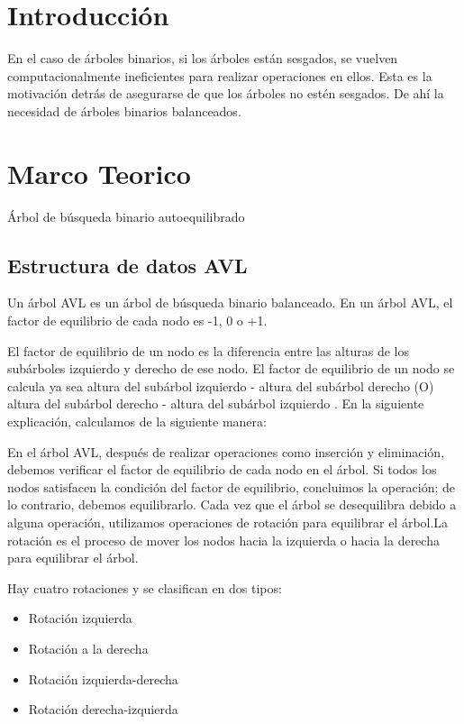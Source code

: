 \documentclass{article}
\begin{document}
    \section{Introducción}
    En el caso de árboles binarios, si los árboles están sesgados, se vuelven computacionalmente ineficientes para realizar operaciones en ellos.
    Esta es la motivación detrás de asegurarse de que los árboles no estén sesgados. De ahí la necesidad de árboles binarios balanceados.

    
    \section{Marco Teorico}
Árbol de búsqueda binario autoequilibrado

	
		\subsection{Estructura de datos AVL}
		
Un árbol AVL es un árbol de búsqueda binario balanceado. En un árbol AVL, el factor de equilibrio de cada nodo es -1, 0 o +1.

El factor de equilibrio de un nodo es la diferencia entre las alturas de los subárboles izquierdo y derecho de ese nodo. El factor de equilibrio de un nodo se calcula ya sea altura del subárbol izquierdo - altura del subárbol derecho (O) altura del subárbol derecho - altura del subárbol izquierdo . En la siguiente explicación, calculamos de la siguiente manera:


En el árbol AVL, después de realizar operaciones como inserción y eliminación, debemos verificar el factor de equilibrio de cada nodo en el árbol. Si todos los nodos satisfacen la condición del factor de equilibrio, concluimos la operación; de lo contrario, debemos equilibrarlo. Cada vez que el árbol se desequilibra debido a alguna operación, utilizamos operaciones de rotación para equilibrar el árbol.La rotación es el proceso de mover los nodos hacia la izquierda o hacia la derecha para equilibrar el árbol.

Hay cuatro rotaciones y se clasifican en dos tipos:

\begin{itemize}
   \item Rotación izquierda
   \item Rotación a la derecha
   \item Rotación izquierda-derecha
   \item Rotación derecha-izquierda
\end{itemize}	
\end{document}
